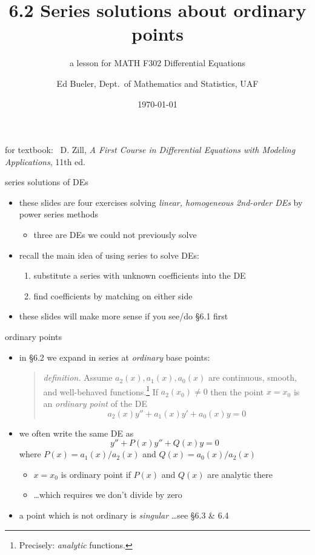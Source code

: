 \documentclass[urlcolor=blue,dvipsnames]{beamer}
\title{6.2 Series solutions about ordinary points}
\subtitle{a lesson for MATH F302 Differential Equations}
\author{Ed Bueler, Dept.~of Mathematics and Statistics, UAF}
\date{\tiny \today}
\begin{document}


\begin{frame}
\titlepage

\centerline{\tiny for textbook: \, D. Zill, \emph{A First Course in Differential Equations with Modeling Applications}, 11th ed.}
\end{frame}


\begin{frame}{series solutions of DEs}

\begin{itemize}
\item these slides are four exercises solving \emph{linear, homogeneous 2nd-order DEs} by power series methods
    \begin{itemize}
    \item \alert{three are DEs we could not previously solve}
    \end{itemize}
\item recall the main idea of using series to solve DEs:

\medskip
\begin{enumerate}
\item substitute a series with unknown coefficients into the DE
\item find coefficients by matching on either side
\end{enumerate}

\medskip
\item these slides will make more sense if you see/do \S6.1 first
\end{itemize}
\end{frame}


\begin{frame}{ordinary points}

\begin{itemize}
\item in \S6.2 we expand in series at \emph{ordinary} base points:

\medskip
\begin{quote}\normalfont
\emph{definition.}  Assume $a_2(x),a_1(x),a_0(x)$ are continuous, smooth, and well-behaved functions.\footnote{Precisely: \emph{analytic} functions.}  If $a_2(x_0)\ne 0$ then the point $x=x_0$ is an \emph{ordinary point} of the DE
    $$a_2(x) y'' + a_1(x) y' + a_0(x) y = 0$$
\end{quote}

\item we often write the same DE as
    $$y'' + P(x) y'' + Q(x) y = 0$$
where $P(x)=a_1(x)/a_2(x)$ and $Q(x)=a_0(x)/a_2(x)$
    \begin{itemize}
    \item $x=x_0$ is ordinary point if $P(x)$ and $Q(x)$ are analytic there
    \item \dots which requires we don't divide by zero
    \end{itemize}
\item a point which is not ordinary is \emph{singular} \dots see \S 6.3 \& 6.4

\bigskip
\end{itemize}
\end{frame}
\end{document}
